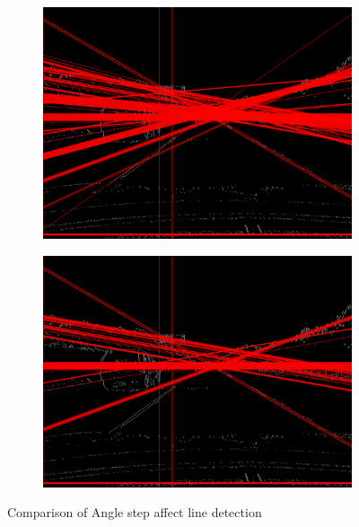 \documentclass[12pt,a4paper]{report}
\begin{document}
\begin{figure}[!htb]
\begin{minipage}{\linewidth}
    \begin{subfigure}{0.49\textwidth}
      \includegraphics[width=\linewidth]{output/img2_q3_HOUGH_THETA_5_THRES_50.png}
    \end{subfigure}
    \begin{subfigure}{0.49\textwidth}
      \includegraphics[width=\linewidth]{output/img2_q3_HOUGH_THETA_10_THRES_50.png}
    \end{subfigure}

    \caption{Comparison of Angle step affect line detection}
  \end{minipage}

\end{figure}
\end{document}
